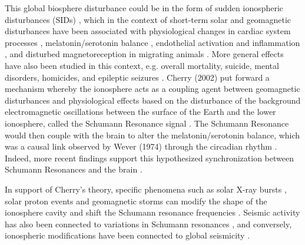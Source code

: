 \documentclass{article}
\begin{document}
This global biosphere disturbance could be in the form of sudden ionospheric disturbances (SIDs) \cite{cannon1982schumann}, which in the context of short-term solar and geomagnetic disturbances have been associated with physiological changes in cardiac system processes \cite{vieira2022geomagnetic,Alabdulgader2018,ghione1998geomagnetic,chernouss2001geophysical,stoupel1995ambulatory,stoupel2011twenty,malin1979correlation,stoupel1993sudden}, melatonin/serotonin balance \cite{burch1999geomagnetic,rapoport1997effects,bergiannaki1996seasonal}, endothelial activation and inflammation \cite{schiff2022role}, and disturbed magnetoreception in migrating animals \cite{keeton1974normal,schreiber1976correlation,kowalski1988normal,bianco2019magnetic,ferrari2017cetacean,vanselow2018solar,granger2020gray}. More general effects have also been studied in this context, e.g. overall mortality, suicide, mental disorders, homicides, and epileptic seizures \cite{zenchenko2021possible,zilli2019geomagnetic,gordon2003effect,kay1994geomagnetic,kay2004schizophrenia,halberg2005chronomics,berk2006ambient,doronin1998effect,persinger1995sudden}. Cherry (2002) put forward a mechanism whereby the ionosphere acts as a coupling agent between geomagnetic disturbances and physiological effects based on the disturbance of the background electromagnetic oscillations between the surface of the Earth and the lower ionosphere, called the Schumann Resonance signal \cite{cherry2002schumann,schumann1952strahlungslosen}. The Schumann Resonance would then couple with the brain to alter the melatonin/serotonin balance, which was a causal link observed by Wever (1974) through the circadian rhythm \cite{wever1974elf}. Indeed, more recent findings support this hypothesized synchronization between Schumann Resonances and the brain \cite{pobachenko2006contingency,saroka2014quantitative,persinger2015human,konig2012biologic}.

In support of Cherry's theory, specific phenomena such as solar X-ray bursts \cite{dyrda2015novel,roldugin2004schumann,satori2005response,satori2016effects,shvets2017effect}, solar proton events \cite{roldugin2004schumann,schlegel1999schumann,singh2014x} and geomagnetic storms \cite{pazos2019analysis,salinas2016solar} can modify the shape of the ionosphere cavity and shift the Schumann resonance frequencies \cite{kudintseva2018modifications,satori2016effects,zhou2015studies}. Seismic activity has also been connected to variations in Schumann resonances \cite{christofilakis2019significant,galuk2019scattering,hayakawa2020scattering}, and conversely, ionospheric modifications have been connected to global seismicity \cite{Marchitelli2020}.
\end{document}
